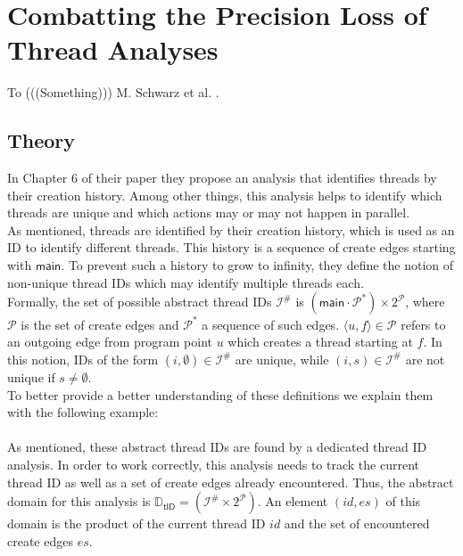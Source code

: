 
\chapter{Combatting the Precision Loss of Thread Analyses}\label{chapter:precisionLossThreadAnalyses}
  To (((Something))) M. Schwarz et al. \parencite{schwarz2023clustered}.
  \section{Theory}
  In Chapter 6 of their paper \parencite{schwarz2023clustered} they propose an analysis that identifies threads by their creation history. Among other things, this analysis helps to identify which threads are unique and which actions may or may not happen in parallel.\\
  As mentioned, threads are identified by their creation history, which is used as an ID to identify different threads. This history is a sequence of create edges starting with $\textsf{main}$. To prevent such a history to grow to infinity, they define the notion of non-unique thread IDs which may identify multiple threads each.\\
  Formally, the set of possible abstract thread IDs $\mathcal{I}^{\#}$ is $(\textsf{main}\cdot\mathcal{P}^*) \times 2^{\mathcal{P}}$, where $\mathcal{P}$ is the set of create edges and $\mathcal{P}^*$ a sequence of such edges. $\langle u, f \rangle \in \mathcal{P}$ refers to an outgoing edge from program point $u$ which creates a thread starting at $f$.
  In this notion, IDs of the form $(i, \emptyset) \in \mathcal{I}^{\#}$ are unique, while $(i, s) \in \mathcal{I}^{\#}$ are not unique if $s \neq \emptyset$.\\
  To better provide a better understanding of these definitions we explain them with the following example:\\
  \\
  As mentioned, these abstract thread IDs are found by a dedicated thread ID analysis. In order to work correctly, this analysis needs to track the current thread ID as well as a set of create edges already encountered. Thus, the abstract domain for this analysis is $\mathbb{D}_\textsf{tID} = (\mathcal{I}^{\#} \times 2^{\mathcal{P}})$. An element $(id, es)$ of this domain is the product of the current thread ID $id$ and the set of encountered create edges $es$.\\
